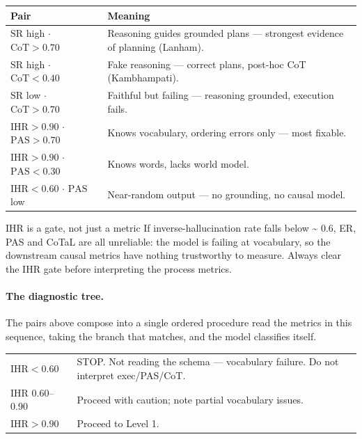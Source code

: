 \begin{table}[H]\small
\centering
\begin{tabularx}{\linewidth}{@{}Y I@{}}
\toprule
Pair & Meaning\\
\midrule
\(\mathrm{SR}\) high \(\cdot\) \(\mathrm{CoT}>0.70\)& Reasoning guides grounded plans --- strongest evidence of planning (Lanham).\\
\addlinespace
\(\mathrm{SR}\) high \(\cdot\) \(\mathrm{CoT}<0.40\)& Fake reasoning --- correct plans, post-hoc CoT (Kambhampati).\\
\addlinespace
\(\mathrm{SR}\) low \(\cdot\) \(\mathrm{CoT}>0.70\)& Faithful but failing --- reasoning grounded, execution fails.\\
\addlinespace
\(\mathrm{IHR}>0.90\) \(\cdot\) \(\mathrm{PAS}>0.70\)& Knows vocabulary, ordering errors only --- most fixable.\\
\addlinespace
\(\mathrm{IHR}>0.90\) \(\cdot\) \(\mathrm{PAS}<0.30\)& Knows words, lacks world model.\\
\addlinespace
\(\mathrm{IHR}<0.60\) \(\cdot\) \(\mathrm{PAS}\) low& Near-random output --- no grounding, no causal model.\\
\bottomrule
\end{tabularx}
\end{table}
\vspace{-\parskip}
\begin{bmcavbox}{IHR is a gate, not just a metric}
If inverse-hallucination rate falls below \textasciitilde{} 0.6, ER, PAS and CoTaL are all unreliable: the model is failing at vocabulary, so the downstream causal metrics have nothing trustworthy to measure. Always clear the IHR gate before interpreting the process metrics.
\end{bmcavbox}

\paragraph{The diagnostic tree.}

The pairs above compose into a single ordered procedure read the metrics in this sequence, taking the branch that matches, and the model classifies itself.

{\small\noindent\begin{tabularx}{\linewidth}{@{}P I@{}}
\toprule
\(\mathrm{IHR}<0.60\) & STOP. Not reading the schema --- vocabulary failure. Do not interpret exec/PAS/CoT.\\
\addlinespace
IHR 0.60--0.90 & Proceed with caution; note partial vocabulary issues.\\
\addlinespace
\(\mathrm{IHR}>0.90\) & Proceed to Level 1.\\
\bottomrule
\end{tabularx}}

